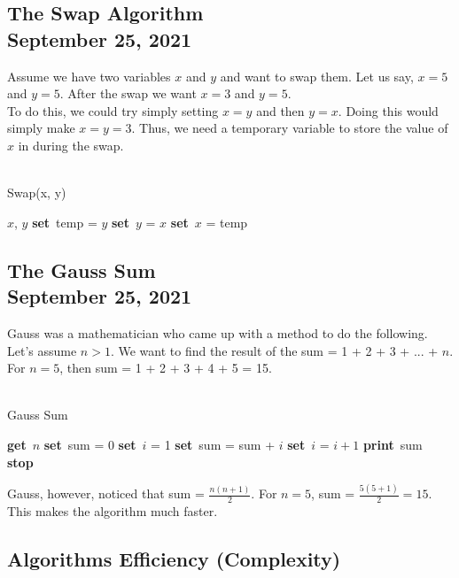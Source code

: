 \documentclass[]{article}
\newcommand{\Get}{\State \textbf{get}~}
\newcommand{\Set}{\State \textbf{set}~}
\newcommand{\Print}{\State \textbf{print}~}
\newcommand{\Stop}{\State \textbf{stop}~}
\begin{document}
\subsection{The Swap Algorithm\\ {\normalfont September 25, 2021}}
\bigbreak

Assume we have two variables $x$ and $y$ and want to swap them. Let us say, $x = 5$ and $y = 5$. After the swap we want $x = 3$ and $y = 5$.\\

To do this, we could try simply setting $x = y$ and then $y = x$. Doing this would simply make $x = y = 3$. Thus, we need a temporary variable to store the value of $x$ in during the swap.

\begin{algorithm}
	\caption{\\Swap(x, y)}
	\begin{algorithmic}[1]
		\Require $x$, $y$
		\Set temp = $y$
		\Set $y$ = $x$
		\Set $x$ = temp
	\end{algorithmic}
\end{algorithm}


\subsection{The Gauss Sum\\ {\normalfont September 25, 2021}}
\bigbreak

Gauss was a mathematician who came up with a method to do the following. Let's assume $n > 1$. We want to find the result of the sum = 1 + 2 + 3 + ... + $n$. For $n = 5$, then sum = 1 + 2 + 3 + 4 + 5 = 15.

\begin{algorithm}
	\caption{\\Gauss Sum}
	\begin{algorithmic}[1]
		\Get $n$
		\Set sum = 0
		\Set $i$ = 1
			\Set sum = sum + $i$
			\Set $i$ = $i + 1$
		\EndWhile
		\Print sum
		\Stop
	\end{algorithmic}
\end{algorithm}


Gauss, however, noticed that sum = $\frac{n(n+1)}{2}$. For $n = 5$, sum = $\frac{5(5+1)}{2} = 15$. This makes the algorithm much faster.


\subsection{Algorithms Efficiency (Complexity)}
\bigbreak
\end{document}
